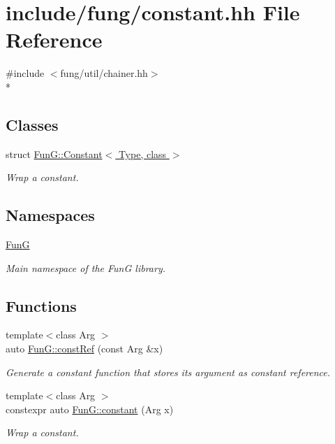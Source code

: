 \hypertarget{constant_8hh}{}\section{include/fung/constant.hh File Reference}
\label{constant_8hh}
{\ttfamily \#include $<$fung/util/chainer.\+hh$>$}\\*
\subsection*{Classes}
\begin{DoxyCompactItemize}
\item 
struct \hyperlink{structFunG_1_1Constant}{Fun\+G\+::\+Constant$<$ Type, class $>$}
\begin{DoxyCompactList}\small\item\em Wrap a constant. \end{DoxyCompactList}\end{DoxyCompactItemize}
\subsection*{Namespaces}
\begin{DoxyCompactItemize}
\item 
 \hyperlink{namespaceFunG}{FunG}
\begin{DoxyCompactList}\small\item\em Main namespace of the FunG library. \end{DoxyCompactList}\end{DoxyCompactItemize}
\subsection*{Functions}
\begin{DoxyCompactItemize}
\item 
{\footnotesize template$<$class Arg $>$ }\\auto \hyperlink{namespaceFunG_abcfb38c2e995436816ea884803302f2d}{Fun\+G\+::const\+Ref} (const Arg \&x)
\begin{DoxyCompactList}\small\item\em Generate a constant function that stores its argument as constant reference. \end{DoxyCompactList}\item 
{\footnotesize template$<$class Arg $>$ }\\constexpr auto \hyperlink{namespaceFunG_a939d13d36c194b402715f12a28147cdc}{Fun\+G\+::constant} (Arg x)
\begin{DoxyCompactList}\small\item\em Wrap a constant. \end{DoxyCompactList}\end{DoxyCompactItemize}
